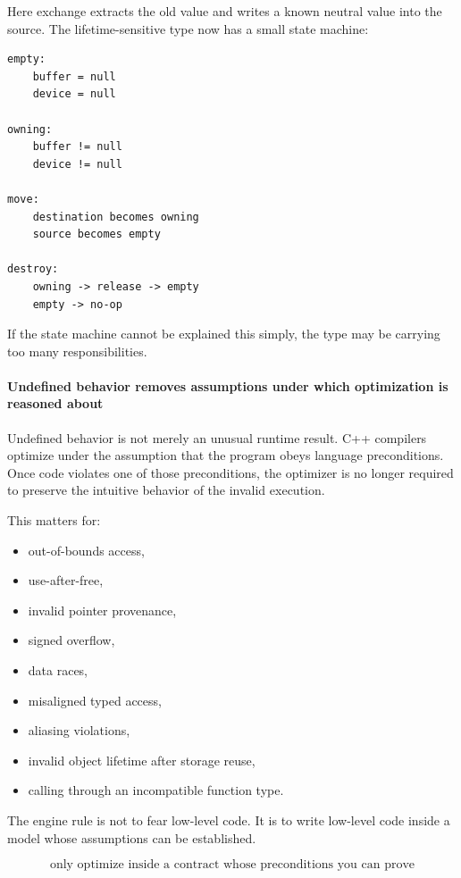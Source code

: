 Here exchange extracts the old value and writes a known neutral value into the source. The lifetime-sensitive type now has a small state machine:

\begin{verbatim}
empty:
    buffer = null
    device = null

owning:
    buffer != null
    device != null

move:
    destination becomes owning
    source becomes empty

destroy:
    owning -> release -> empty
    empty -> no-op
\end{verbatim}

If the state machine cannot be explained this simply, the type may be carrying too many responsibilities.

\paragraph{Undefined behavior removes assumptions under which optimization is reasoned about}\label{undefined-behavior-removes-assumptions-under-which-optimization-is-reasoned-about}

Undefined behavior is not merely an unusual runtime result. C++ compilers optimize under the assumption that the program obeys language preconditions. Once code violates one of those preconditions, the optimizer is no longer required to preserve the intuitive behavior of the invalid execution.

This matters for:

\begin{itemize}
\tightlist
\item
  out-of-bounds access,
\item
  use-after-free,
\item
  invalid pointer provenance,
\item
  signed overflow,
\item
  data races,
\item
  misaligned typed access,
\item
  aliasing violations,
\item
  invalid object lifetime after storage reuse,
\item
  calling through an incompatible function type.
\end{itemize}

The engine rule is not to fear low-level code. It is to write low-level code inside a model whose assumptions can be established.

\[
\boxed{
\text{only optimize inside a contract whose preconditions you can prove}
}
\]

